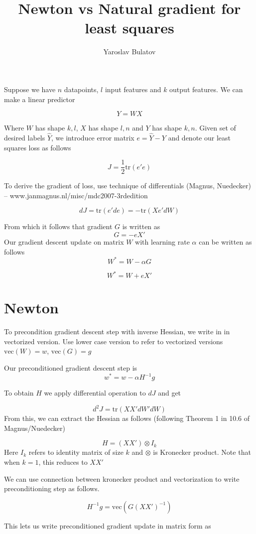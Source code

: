 \documentclass{article}
\begin{document}
\title{Newton vs Natural gradient for least squares}
\author{Yaroslav Bulatov}

\maketitle
Suppose we have $n$ datapoints, $l$ input features and $k$ output features. We can make a linear predictor

$$Y=WX$$

Where $W$ has shape $k,l$, $X$ has shape $l,n$ and $Y$ has shape $k,n$.
Given set of desired labels $\hat{Y}$, we introduce error matrix $e=\hat{Y}-Y$ and denote our least squares loss as follows

$$J=\frac{1}{2}\text{tr}(e'e)$$

To derive the gradient of loss, use technique of differentials (Magnus, Nuedecker) -- www.janmagnus.nl/misc/mdc2007-3rdedition


$$dJ = \text{tr}(e' de) = -\text{tr}(Xe'dW)$$

From which it follows that gradient $G$ is written as
$$G = -e X'$$
Our gradient descent update on matrix $W$ with learning rate $\alpha$ can be written as follows
$$W^* = W - \alpha G$$

$$W^* = W + e X'$$
\section{Newton}
To precondition gradient descent step with inverse Hessian, we write in in vectorized version. Use lower case version to refer to vectorized versions $\text{vec}(W)=w$, $\text{vec}(G)=g$

Our preconditioned gradient descent step is
$$w^* = w-\alpha H^{-1}g$$

To obtain $H$ we apply differential operation to $dJ$ and get

$$d^2 J = \text{tr}(XX'dW' dW)$$
From this, we can extract the Hessian as follows (following Theorem 1 in 10.6 of Magnus/Nuedecker)

$$H=(XX')\otimes I_k$$
Here $I_k$ refers to identity matrix of size $k$ and $\otimes$ is Kronecker product. Note that when $k=1$, this reduces to $XX'$

We can use connection between kronecker product and vectorization to write preconditioning step as follows.

$$H^{-1}g = \text{vec}(G(XX')^{-1})$$

This lets us write preconditioned gradient update in matrix form as
\end{document}
